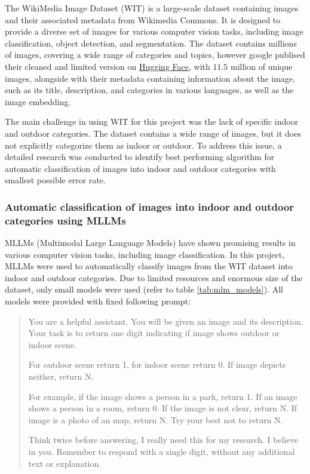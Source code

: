 \documentclass[a4paper]{article}
\begin{document}
The WikiMedia Image Dataset (WIT) is a large-scale dataset containing images and their associated metadata from Wikimedia Commons. It is designed to provide a diverse set of images for various computer vision tasks, including image classification, object detection, and segmentation. The dataset contains millions of images, covering a wide range of categories and topics, however google publised their cleaned and limited version on \href{https://huggingface.co/datasets/google/wit}{Hugging Face}, with $11.5$ million of unique images, alongside with their metadata containing information about the image, such as its title, description, and categories in various languages, as well as the image embedding.

The main challenge in using WIT for this project was the lack of specific indoor and outdoor categories. The dataset contains a wide range of images, but it does not explicitly categorize them as indoor or outdoor. To address this issue, a detailed research was conducted to identify best performing algorithm for automatic classification of images into indoor and outdoor categories with smallest possible error rate.

\subsubsection{Automatic classification of images into indoor and outdoor categories using MLLMs}

MLLMs (Multimodal Large Language Models) have shown promising results in various computer vision tasks, including image classification. In this project, MLLMs were used to automatically classify images from the WIT dataset into indoor and outdoor categories. Due to limited resources and enormous size of the dataset, only small models were used (refer to table \ref{tab:mlm_models}). All models were provided with fixed following prompt:

\begin{quote}
You are a helpful assistant. You will be given an image and its description.
Your task is to return one digit indicating if image shows outdoor or indoor scene.

For outdoor scene return 1, for indoor scene return 0. If image depicts neither, return N.

For example, if the image shows a person in a park, return 1.
If an image shows a person in a room, return 0.
If the image is not clear, return N. If image is a photo of an map, return N.
Try your best not to return N.

Think twice before answering, I really need this for my research. I believe in you.
Remember to respond with a single digit, without any additional text or explanation.
\end{quote}
\end{document}
